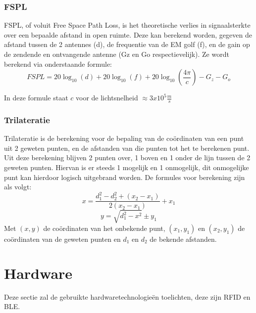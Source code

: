 \subsubsection{FSPL}
FSPL, of voluit Free Space Path Loss, is het theoretische verlies in signaalsterkte over een bepaalde afstand in open ruimte. Deze kan berekend worden, gegeven de afstand tussen de 2 antennes (d), de frequentie van de EM golf (f), en de gain op de zendende en ontvangende antenne (Gz en Go respectievelijk). Ze wordt berekend via onderstaande formule: 
\[FSPL = 20\log_{10}(d) + 20\log_{10}(f) + 20\log_{10}(\frac{4\pi}{c}) - G_z - G_o \]
\autocite{Pasternack2020}

In deze formule staat \(c\) voor de lichtsnelheid \(\approx3x10^5 \frac{m}{s}\)
\autocite{SOL2022}

\subsubsection{Trilateratie}
Trilateratie is de berekening voor de bepaling van de coördinaten van een punt uit 2 geweten punten, en de afstanden van die punten tot het te berekenen punt. Uit deze berekening blijven 2 punten over, 1 boven en 1 onder de lijn tussen de 2 geweten punten. Hiervan is er steeds 1 mogelijk en 1 onmogelijk, dit onmogelijke punt kan hierdoor logisch uitgebrand worden. De formules voor berekening zijn als volgt:
 \[x = \frac{d_1^2 - d_2^2 + (x_2 - x_1)}{2(x_2 - x_1)} + x_1\]
 \[y = \sqrt{d_1^2 - x^2} \pm y_1\]
 Met \((x,  y)\) de coördinaten van het onbekende punt,  \((x_1, y_1)\) en \((x_2, y_1)\) de coördinaten van de geweten punten en \(d_1\) en \(d_2\) de bekende afstanden.
 \autocite{TRM2022}

\section{Hardware}
\label{sec:lit-hardware}
Deze sectie zal de gebruikte hardwaretechnologieën toelichten, deze zijn RFID en BLE.

